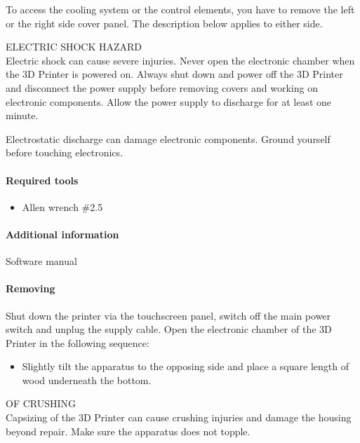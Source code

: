 To access the cooling system or the control elements, you have to remove the left or the right side cover panel. The description below applies to either side. 

\begin{danger}
  ELECTRIC SHOCK HAZARD\\
  Electric shock can cause severe injuries. Never open the electronic chamber when the 3D Printer is powered on.
  Always shut down and power off the 3D Printer and disconnect the power supply before removing covers and working on electronic components. Allow the power supply to discharge for at least one minute. 
\end{danger}

\begin{notice}
  Electrostatic discharge can damage electronic components. Ground yourself before touching electronics. 
\end{notice}

\paragraph{Required tools}
\begin{itemize}
  \item Allen wrench \#2.5 
\end{itemize}

\paragraph{Additional information}

Software manual

\paragraph{Removing}

Shut down the printer via the touchscreen panel, switch off the main power switch and unplug the supply cable. Open the electronic chamber of the 3D Printer in the following sequence:

\begin{itemize}
  \item Slightly tilt the apparatus to the opposing side and place a square length of wood underneath the bottom.
\end{itemize}

\begin{danger}
  OF CRUSHING\\
  Capsizing of the 3D Printer can cause crushing injuries and damage the housing beyond repair. Make sure the apparatus does not topple. 
\end{danger}

